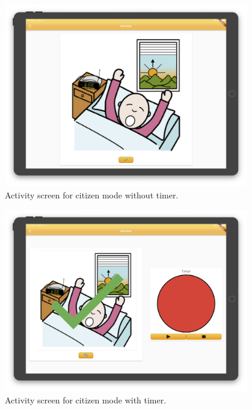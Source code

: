 \begin{figure}[H]
    \begin{center}
        \includegraphics[width=0.95\textwidth]{figures/FinalScreen/showActivityCitizenWithout.png}
    \end{center}
    \caption{Activity screen for citizen mode without timer.}
    \label{fig:finalShowActivityCitizenWithoutTimer}
\end{figure}\begin{figure}[H]
    \begin{center}
        \includegraphics[width=0.95\textwidth]{figures/FinalScreen/showActivityCitizenWithTimer.png}
    \end{center}
    \caption{Activity screen for citizen mode with timer.}
    \label{fig:finalShowActivityCitizenWithTimer}
\end{figure}

